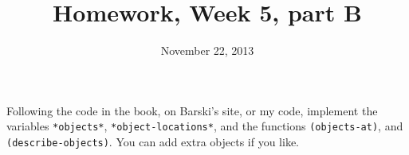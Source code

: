 \documentclass{article}
\title{Homework, Week 5, part B}
\date{November 22, 2013}
\begin{document}
\maketitle{}

\paragraph{}Following the code in the book, on Barski's site, or my code, implement the variables \texttt{*objects*}, \texttt{*object-locations*}, and the functions \texttt{(objects-at)}, and \texttt{(describe-objects)}. You can add extra objects if you like.
\end{document}
